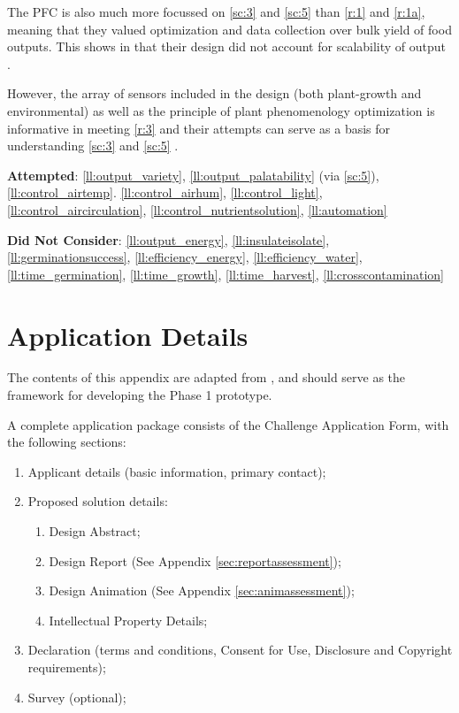\documentclass{report}
\begin{document}
\begin{appendices}
The PFC is also much more focussed on \ref{sc:3} and \ref{sc:5} than \ref{r:1} and \ref{r:1a}, meaning that they valued optimization and data collection over bulk yield of food outputs. This shows in that their design did not account for scalability of output \cite{mit-wfp}.

However, the array of sensors included in the design (both plant-growth and environmental) as well as the principle of plant phenomenology optimization is informative in meeting \ref{r:3} and their attempts can serve as a basis for understanding \ref{sc:3} and \ref{sc:5} \cite{mit-openag}.

\textbf{Attempted}: \ref{ll:output_variety}, \ref{ll:output_palatability} (via \ref{sc:5}), \ref{ll:control_airtemp}. \ref{ll:control_airhum}, \ref{ll:control_light}, \ref{ll:control_aircirculation}, \ref{ll:control_nutrientsolution}, \ref{ll:automation}

\textbf{Did Not Consider}: \ref{ll:output_energy}, \ref{ll:insulateisolate}, \ref{ll:germinationsuccess}, \ref{ll:efficiency_energy}, \ref{ll:efficiency_water}, \ref{ll:time_germination}, \ref{ll:time_growth}, \ref{ll:time_harvest}, \ref{ll:crosscontamination}

\newpage
\section{Application Details}
\label{sec:application}

The contents of this appendix are adapted from \cite{applicantguide}, and should serve as the framework for developing the Phase 1 prototype.

A complete application package consists of the Challenge Application Form, with the following sections:
\begin{enumerate}
    \item Applicant details (basic information, primary contact);
    \item Proposed solution details:
    \begin{enumerate}
        \item Design Abstract;
        \item Design Report (See Appendix \ref{sec:reportassessment});
        \item Design Animation (See Appendix \ref{sec:animassessment});
        \item Intellectual Property Details;
    \end{enumerate}
    \item Declaration (terms and conditions, Consent for Use, Disclosure and Copyright requirements);
    \item Survey (optional);
\end{enumerate}


\end{appendices}
\end{document}
